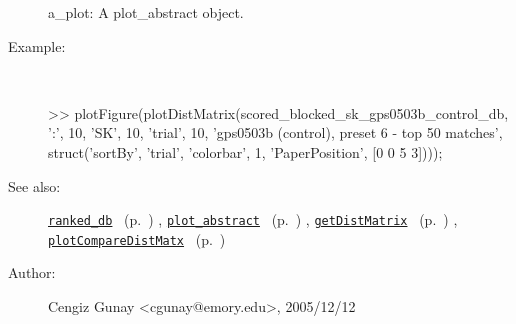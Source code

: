 \begin{description}
	a\_plot: A plot\_abstract object.
%
\item[Example:]~
\begin{lyxcode} >> plotFigure(plotDistMatrix(scored\_blocked\_sk\_gps0503b\_control\_db, ':', 10, 'SK', 10, 'trial', 10, 'gps0503b (control), preset 6 - top 50 matches', struct('sortBy', 'trial', 'colorbar', 1, 'PaperPosition', [0 0 5 3])));\\%
\end{lyxcode}
%
\item[See also:]%
\hyperlink{ref_ranked_db}{\texttt{ranked\_db}}%
\ (p.~\pageref{ref_ranked_db})%
%
, \hyperlink{ref_plot_abstract}{\texttt{plot\_abstract}}%
\ (p.~\pageref{ref_plot_abstract})%
%
, \hyperlink{ref_getDistMatrix}{\texttt{getDistMatrix}}%
\ (p.~\pageref{ref_getDistMatrix})%
%
, \hyperlink{ref_plotCompareDistMatx}{\texttt{plotCompareDistMatx}}%
\ (p.~\pageref{ref_plotCompareDistMatx})%
%
%
\item[Author:]%
Cengiz Gunay <cgunay@emory.edu>, 2005/12/12%
\end{description}
\methodline%

